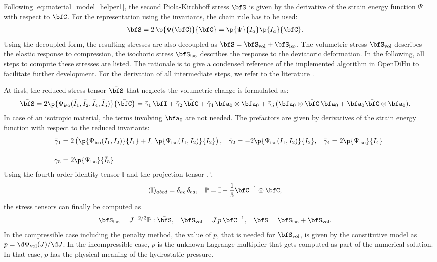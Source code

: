 Following \cref{eq:material_model_helper1}, the second Piola-Kirchhoff stress $\bfS$ is given by the derivative of the strain energy function $\Psi$ with respect to $\bfC$.
For the representation using the invariants, the chain rule has to be used:%
\begin{align*}
   \bfS &= 2\,\p{\Psi(\bfC)}{\bfC} = \p{\Psi}{I_a}\p{I_a}{\bfC}.
\end{align*}
Using the decoupled form, the resulting stresses are also decoupled as $\bfS = \bfS_\text{vol}+\bfS_\text{iso}$. The volumetric stress $\bfS_\text{vol}$ describes the elastic response to compression, the isochoric stress $\bfS_\text{iso}$ describes the response to the deviatoric deformation. In the following, all steps to compute these stresses are listed. The rationale is to give a condensed reference of the implemented algorithm in OpenDiHu to facilitate further development.
For the derivation of all intermediate steps, we refer to the literature \cite{holzapfel2000nonlinear}.

At first, the reduced stress tensor $\bar{\bfS}$ that neglects the volumetric change is formulated as:%
%
\begin{align*}
  \bar{\bfS} = 2\p{\Psi_\text{iso}(\bar{I}_1,\bar{I}_2,\bar{I}_4,\bar{I}_5)}{\bar{\bfC}} &= \bar{\gamma}_1\,\bfI + \bar{\gamma}_2\,\bar{\bfC}
  + \bar{\gamma}_4\, \bfa_0 \otimes \bfa_0 + \bar{\gamma}_5\,(\bfa_0 \otimes \bar{\bfC}\,\bfa_0 + \bfa_0\bar{\bfC}\otimes \bfa_0).
\end{align*}
In case of an isotropic material, the terms involving $\bfa_0$ are not needed. The prefactors are given by derivatives of the strain energy function with respect to the reduced invariants:
%
\begin{align*}
  \bar{\gamma}_1 &= 2\left(\p{\Psi_\text{iso}(\bar{I}_1, \bar{I}_2)}{\bar{I}_1} + \bar{I}_1\,\p{\Psi_\text{iso}(\bar{I}_1, \bar{I}_2)}{\bar{I}_2}\right),
  &\bar{\gamma}_2 &= -2\p{\Psi_\text{iso}(\bar{I}_1, \bar{I}_2)}{\bar{I}_2},
  &\bar{\gamma}_4 &= 2\p{\Psi_\text{iso}}{\bar{I}_4}\\[4mm]
  \bar{\gamma}_5 &= 2\p{\Psi_\text{iso}}{\bar{I}_5}
\end{align*}
%
Using the fourth order identity tensor $\mathbb{I}$ and the projection tensor $\mathbb{P}$,%
\begin{align*}
  (\mathbb{I})_{abcd} &= \delta_{ac}\,\delta_{bd}, &
  \mathbb{P} &= \mathbb{I} - \dfrac13 \bfC^{-1} \otimes \bfC,
\end{align*}
the stress tensors can finally be computed as
\begin{align*}
  \bfS_\text{iso} &= J^{-2/3}\mathbb{P}:\bar{\bfS}, &
  \bfS_\text{vol} &= J\,p\,\bfC^{-1}, &
  \bfS &= \bfS_\text{iso} + \bfS_\text{vol}.
\end{align*}
In the compressible case including the penalty method, the value of $p$, that is needed for $\bfS_\text{vol}$, is given by the constitutive model as $p = \d \Psi_\text{vol}(J)/\d J$. In the incompressible case, $p$ is the unknown Lagrange multiplier that gets computed as part of the numerical solution. In that case, $p$ has the physical meaning of the hydrostatic pressure.

